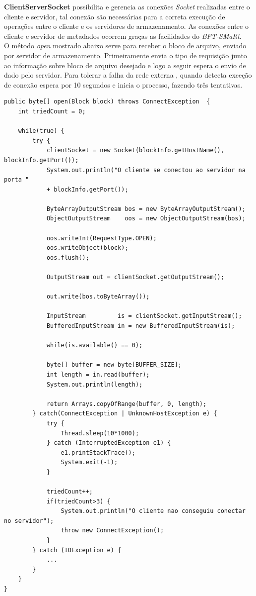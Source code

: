 \textbf{ClientServerSocket} possibilita e gerencia as conexões \textit{Socket} realizadas entre o cliente e servidor, tal conexão são necessárias para a correta execução de operações entre o cliente e os servidores de armazenamento. As conexões entre o cliente e servidor de metadados ocorrem graças as facilidades do \textit{BFT-SMaRt}.
\\

O método \textit{open} mostrado abaixo serve para receber o bloco de arquivo, enviado por servidor de armazenamento.
Primeiramente envia o tipo de requisição junto ao informação sobre bloco de arquivo desejado e logo a seguir espera o envio de dado pelo servidor.
Para tolerar a falha da rede externa , quando detecta exceção de conexão espera por 10 segundos e inicia o processo, fazendo três tentativas.

\begin{lstlisting}[basicstyle=\ttfamily\footnotesize, frame=single]	
public byte[] open(Block block) throws ConnectException  {
	int triedCount = 0;
	
	while(true) {
		try {
			clientSocket = new Socket(blockInfo.getHostName(), blockInfo.getPort());
			System.out.println("O cliente se conectou ao servidor na porta " 
			+ blockInfo.getPort());
			
			ByteArrayOutputStream bos = new ByteArrayOutputStream();
			ObjectOutputStream    oos = new ObjectOutputStream(bos);
			
			oos.writeInt(RequestType.OPEN);
			oos.writeObject(block);
			oos.flush();
			
			OutputStream out = clientSocket.getOutputStream();
			
			out.write(bos.toByteArray());
		
			InputStream         is = clientSocket.getInputStream();
			BufferedInputStream in = new BufferedInputStream(is);
			
			while(is.available() == 0);
			
			byte[] buffer = new byte[BUFFER_SIZE];
			int length = in.read(buffer);
			System.out.println(length);
		
			return Arrays.copyOfRange(buffer, 0, length);
		} catch(ConnectException | UnknownHostException e) {
			try {
				Thread.sleep(10*1000);
			} catch (InterruptedException e1) {
				e1.printStackTrace();
				System.exit(-1);
			}
			
			triedCount++;
			if(triedCount>3) {
				System.out.println("O cliente nao conseguiu conectar no servidor");
				throw new ConnectException();
			}
		} catch (IOException e) {
			...
		}
	}
}
\end{lstlisting}


